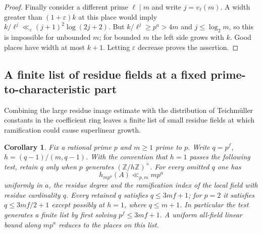 \documentclass[11pt,letterpaper]{article}
\newtheorem{corollary}[corollary]{Corollary}
\theoremstyle{definition}
\numberwithin{equation}{section}
\begin{document}
\begin{proof}
Finally consider a different prime $\ell\mid m$ and write
$j=v_\ell(m)$. A width greater than $(1+\varepsilon)k$ at this
place would imply $k/\ell^j\ll_\varepsilon(j+1)^2\log(2j+2)$.
But $k/\ell^j\ge p^a>4m$ and $j\le\log_2 m$, so this is
impossible for unbounded $m$; for bounded $m$ the left side grows
with $k$. Good places have width at most $k+1$. Letting
$\varepsilon$ decrease proves the assertion.
\end{proof}

\subsection{A finite list of residue fields at a fixed prime-to-characteristic part}
\label{sec:inert-residue-test}
Combining the large residue image estimate with the distribution of
Teichm\"uller constants in the coefficient ring leaves a finite list
of small residue fields at which ramification could cause superlinear
growth.
\begin{corollary}\label{cor:inert-residue-test}
Fix a rational prime $p$ and $m\ge1$ prime to $p$. Write
$q=p^f$, $h=(q-1)/(m,q-1)$. With the convention that $h=1$ passes
the following test, retain $q$ only when $p$ generates
$(\mathbb Z/h\mathbb Z)^\times$.
For every omitted $q$ one has
\[
            h_{mp^a}(A)\ll_{p,m} mp^a
\]
uniformly in $a$, the residue degree and the ramification index
of the local field with residue cardinality $q$. Every retained
$q$ satisfies $q\le3mf+1$; for $p=2$ it satisfies
$q\le3mf/2+1$ except possibly at $h=1$, where $q\le m+1$.
In particular the test generates a finite list by first solving
$p^f\le 3mf+1$. A uniform all-field linear bound along $mp^a$
reduces to the places on this list.
\end{corollary}
\end{document}
